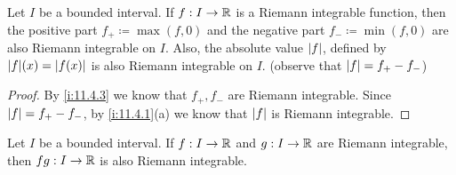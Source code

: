 \begin{cor}\label{i:11.4.4}
  \quad
  Let \(I\) be a bounded interval.
  If \(f : I \to \mathbb{R}\) is a Riemann integrable function, then the positive part \(f_+ \coloneqq \max(f, 0)\) and the negative part \(f_- \coloneqq \min(f, 0)\) are also Riemann integrable on \(I\).
  Also, the absolute value \(\left\lvert f\right\rvert\), defined by \(\abs{f}(x) = \abs{f(x)}\) is also Riemann integrable on \(I\).
  (observe that \(\left\lvert f\right\rvert = f_+ - f_-\))
\end{cor}

\begin{proof}
  By \cref{i:11.4.3} we know that \(f_+, f_-\) are Riemann integrable.
  Since \(\left\lvert f\right\rvert = f_+ - f_-\), by \cref{i:11.4.1}(a) we know that \(\left\lvert f\right\rvert\) is Riemann integrable.
\end{proof}

\begin{thm}\label{i:11.4.5}
  Let \(I\) be a bounded interval.
  If \(f : I \to \mathbb{R}\) and \(g : I \to \mathbb{R}\) are Riemann integrable, then \(fg : I \to \mathbb{R}\) is also Riemann integrable.
\end{thm}

